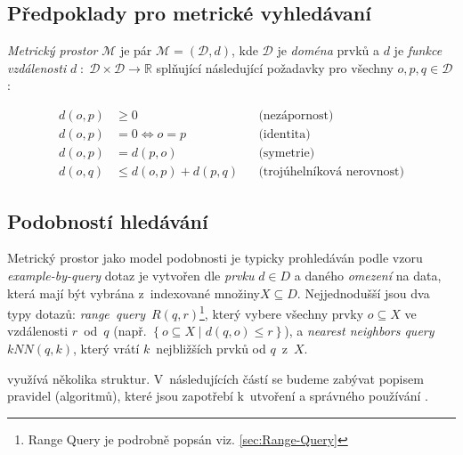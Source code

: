\subsection{Předpoklady pro metrické vyhledávaní}

\emph{Metrický prostor }$\mathcal{M}$ je pár $\mathcal{M}=(\mathcal{D},d)$,
kde $\mathcal{D}$ je \emph{doména} prvků a $d$ je \emph{funkce vzdálenosti}
$d\;:\;\mathcal{D}\times\mathcal{D}\rightarrow\mathbb{R}$ splňující
následující požadavky pro všechny $o,p,q\in\mathcal{D}$:

\begin{align*}
d(o,p) & \geq0 &  & \textrm{(nezápornost)}\\
d(o,p) & =0\Longleftrightarrow o=p &  & \textrm{(identita)}\\
d(o,p) & =d(p,o) &  & \textrm{(symetrie)}\\
d(o,q) & \leq d(o,p)+d(p,q) &  & \textrm{(trojúhelníková nerovnost)}
\end{align*}



\subsection{Podobností hledávání}

Metrický prostor jako model podobnosti je typicky prohledáván podle
vzoru \emph{example-by-query} \textendash{} dotaz je vytvořen dle
\emph{prvku} $d\in D$ a daného \emph{omezení} na data, která mají
být vybrána z~indexované množiny$X\subseteq D$\@. Nejjednodušší
jsou dva typy dotazů: \emph{range~query}~$R(q,r)$\footnote{Range Query je podrobně popsán viz. \vref{sec:Range-Query}
}, který vybere všechny prvky $o\subseteq X$ ve vzdálenosti $r$~od~$q$
(např. $\left\{ o\subseteq X\mid d(q,o)\leq r\right\} $), a \emph{nearest
neighbors query} $kNN(q,k)$, který vrátí $k$~nejbližších prvků
od $q$~z~$X$\@.

\MIndex{} využívá několika struktur\@. V~následujících částí se budeme
zabývat popisem pravidel (algoritmů), které jsou zapotřebí k~utvoření
a správného používání .